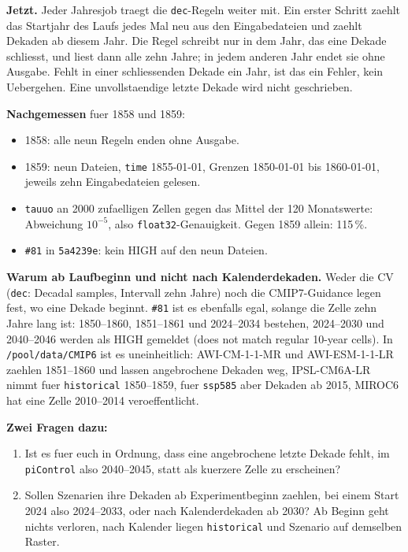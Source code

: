 \documentclass[11pt,a4paper]{article}
\newcommand{\code}[1]{\texttt{\small #1}}
\begin{document}
\textbf{Jetzt.} Jeder Jahresjob traegt die \code{dec}-Regeln weiter mit. Ein erster
Schritt zaehlt das Startjahr des Laufs jedes Mal neu aus den Eingabedateien und
zaehlt Dekaden ab diesem Jahr. Die Regel schreibt nur in dem Jahr, das eine Dekade
schliesst, und liest dann alle zehn Jahre; in jedem anderen Jahr endet sie ohne
Ausgabe. Fehlt in einer schliessenden Dekade ein Jahr, ist das ein Fehler, kein
Uebergehen. Eine unvollstaendige letzte Dekade wird nicht geschrieben.

\textbf{Nachgemessen} fuer 1858 und 1859:

\begin{itemize}
\item 1858: alle neun Regeln enden ohne Ausgabe.
\item 1859: neun Dateien, \code{time} 1855-01-01, Grenzen 1850-01-01 bis
  1860-01-01, jeweils zehn Eingabedateien gelesen.
\item \code{tauuo} an 2000 zufaelligen Zellen gegen das Mittel der 120 Monatswerte:
  Abweichung $10^{-5}$, also \code{float32}-Genauigkeit. Gegen 1859 allein: 115\,\%.
\item \code{\#81} in \code{5a4239e}: kein HIGH auf den neun Dateien.
\end{itemize}

\textbf{Warum ab Laufbeginn und nicht nach Kalenderdekaden.} Weder die CV
(\code{dec}: \glqq Decadal samples\grqq, Intervall zehn Jahre) noch die CMIP7-Guidance
legen fest, wo eine Dekade beginnt. \code{\#81} ist es ebenfalls egal, solange die
Zelle zehn Jahre lang ist: 1850--1860, 1851--1861 und 2024--2034 bestehen,
2024--2030 und 2040--2046 werden als HIGH gemeldet (\glqq does not match regular
10-year cells\grqq). In \code{/pool/data/CMIP6} ist es uneinheitlich: AWI-CM-1-1-MR
und AWI-ESM-1-1-LR zaehlen 1851--1860 und lassen angebrochene Dekaden weg,
IPSL-CM6A-LR nimmt fuer \code{historical} 1850--1859, fuer \code{ssp585} aber
Dekaden ab 2015, MIROC6 hat eine Zelle 2010--2014 veroeffentlicht.

\textbf{Zwei Fragen dazu:}
\begin{enumerate}
\item Ist es fuer euch in Ordnung, dass eine angebrochene letzte Dekade fehlt, im
  \code{piControl} also 2040--2045, statt als kuerzere Zelle zu erscheinen?
\item Sollen Szenarien ihre Dekaden ab Experimentbeginn zaehlen, bei einem Start
  2024 also 2024--2033, oder nach Kalenderdekaden ab 2030? Ab Beginn geht nichts
  verloren, nach Kalender liegen \code{historical} und Szenario auf demselben Raster.
\end{enumerate}
\end{document}

